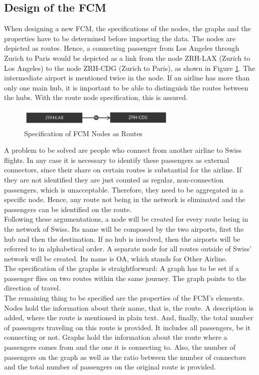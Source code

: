 \documentclass[conference]{IEEEtran}
\begin{document}
\subsection{Design of the FCM}
\label{subsec:design}
When designing a new FCM, the specifications of the nodes, the graphs and the properties have to be determined before importing the data. The nodes are depicted as routes. Hence, a connecting passenger from Los Angeles through Zurich to Paris would be depicted as a link from the node ZRH-LAX (Zurich to Los Angeles) to the node ZRH-CDG (Zurich to Paris), as shown in Figure \ref{fig:noderoute}. The intermediate airport is mentioned twice in the node. If an airline has more than only one main hub, it is important to be able to distinguish the routes between the hubs. With the route node specification, this is assured.\newline
\begin{figure}[h]
\includegraphics[width=3in]{img/route.png}
\centering
\caption{Specification of FCM Nodes as Routes}
\label{fig:noderoute}
\end{figure}
\newline A problem to be solved are people who connect from another airline to Swiss flights. In any case it is necessary to identify these passengers as external connectors, since their share on certain routes is substantial for the airline. If they are not identified they are just counted as regular, non-connection passengers, which is unacceptable. Therefore, they need to be aggregated in a specific node. Hence, any route not being in the network is eliminated and the passengers can be identified on the route.\\
Following these argumentations, a node will be created for every route being in the network of Swiss. Its name will be composed by the two airports, first the hub and then the destination. If no hub is involved, then the airports will be referred to in alphabetical order. A separate node for all routes outside of Swiss' network will be created. Its name is OA, which stands for Other Airline.\\
The specification of the graphs is straightforward: A graph has to be set if a passenger flies on two routes within the same journey. The graph points to the direction of travel.\\
The remaining thing to be specified are the properties of the FCM's elements. Nodes hold the information about their name, that is, the route. A description is added, where the route is mentioned in plain text. And, finally, the total number of passengers traveling on this route is provided. It includes all passengers, be it connecting or not. Graphs hold the information about the route where a passengers comes from and the one it is connecting to. Also, the number of passengers on the graph as well as the ratio between the number of connectors and the total number of passengers on the original route is provided.\\
\end{document}
